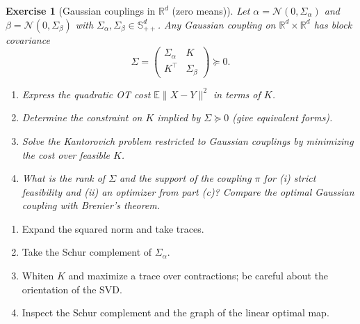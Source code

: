 \documentclass[11pt,a4paper]{article}
\theoremstyle{exostyle}
\newtheorem{exercise}{Exercise}
\newcommand{\R}{\mathbb{R}}
\begin{document}
\begin{exercise}[Gaussian couplings in $\R^d$ (zero means)]\label{ex:gaussRd}
Let $\alpha=\mathcal N(0,\Sigma_\alpha)$ and $\beta=\mathcal N(0,\Sigma_\beta)$ with $\Sigma_\alpha,\Sigma_\beta\in\mathbb S_{++}^d$.
Any Gaussian coupling on $\R^d\times\R^d$ has block covariance
\[
\Sigma=\begin{pmatrix}\Sigma_\alpha & K\\ K^\top & \Sigma_\beta\end{pmatrix}\succeq0.
\]
\begin{enumerate}[label=(\alph*), itemsep=4pt]
\item Express the quadratic OT cost $\mathbb E\|X-Y\|^2$ in terms of $K$.
\item Determine the constraint on $K$ implied by $\Sigma\succeq0$ (give equivalent forms).
\item Solve the Kantorovich problem \emph{restricted to Gaussian couplings} by minimizing the cost over feasible $K$.
\item What is the rank of $\Sigma$ and the support of the coupling $\pi$ for (i) strict feasibility and (ii) an optimizer from part (c)? Compare the optimal Gaussian coupling with Brenier's theorem.
\end{enumerate}
\end{exercise}
\begin{hints}
\begin{enumerate}[label=(\alph*)]\item Expand the squared norm and take traces.\item Take the Schur complement of $\Sigma_\alpha$.\item Whiten $K$ and maximize a trace over contractions; be careful about the orientation of the SVD.\item Inspect the Schur complement and the graph of the linear optimal map.\end{enumerate}
\end{hints}
\end{document}
